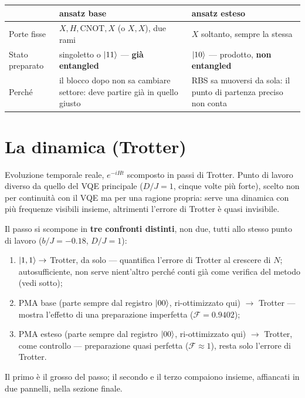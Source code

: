 \documentclass[11pt,a4paper]{article}
\begin{document}
\begin{center}
\small
\renewcommand{\arraystretch}{1.3}
\begin{tabular}{@{}p{2.6cm}p{4.9cm}p{4.9cm}@{}}
\toprule
\rowcolor{grigetto}
 & \textbf{ansatz base} & \textbf{ansatz esteso} \\
\midrule
Porte fisse &
$X,H,\text{CNOT},X$ (o $X,X$), due rami &
$X$ soltanto, sempre la stessa \\
Stato preparato &
singoletto o $\lvert 11\rangle$ --- \textbf{già entangled} &
$\lvert 10\rangle$ --- prodotto, \textbf{non entangled} \\
Perché &
il blocco dopo non sa cambiare settore: deve partire già in quello giusto &
RBS sa muoversi da sola: il punto di partenza preciso non conta \\
\bottomrule
\end{tabular}
\end{center}


\section{La dinamica (Trotter)}

Evoluzione temporale reale, $e^{-iHt}$ scomposto in passi di Trotter. Punto
di lavoro diverso da quello del VQE principale ($D/J=1$, cinque volte più
forte), scelto non per continuità con il VQE ma per una ragione propria:
serve una dinamica con più frequenze visibili insieme, altrimenti l'errore
di Trotter è quasi invisibile.

Il passo si scompone in \textbf{tre confronti distinti}, non due, tutti
allo stesso punto di lavoro ($b/J=-0.18$, $D/J=1$):
\begin{enumerate}[label=(\arabic*),leftmargin=2.2em,itemsep=4pt]
\item $\lvert 1,1\rangle\to$ Trotter, da solo --- quantifica l'errore di Trotter al
  crescere di $N$; autosufficiente, non serve nient'altro perché conti già
  come verifica del metodo (vedi sotto);
\item PMA base (parte sempre dal registro $\lvert 00\rangle$, ri-ottimizzato qui)
  $\to$ Trotter --- mostra l'effetto di una preparazione imperfetta
  ($\mathcal F=0.9402$);
\item PMA esteso (parte sempre dal registro $\lvert 00\rangle$, ri-ottimizzato qui)
  $\to$ Trotter, come controllo --- preparazione quasi perfetta
  ($\mathcal F\approx1$), resta solo l'errore di Trotter.
\end{enumerate}
Il primo è il grosso del passo; il secondo e il terzo compaiono insieme,
affiancati in due pannelli, nella sezione finale.
\end{document}
